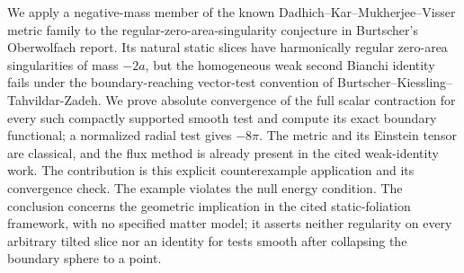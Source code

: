 
We apply a negative-mass member of the known Dadhich--Kar--Mukherjee--Visser
metric family to the regular-zero-area-singularity conjecture in Burtscher's
Oberwolfach report. Its natural static slices have harmonically regular
zero-area singularities of mass $-2a$, but the homogeneous weak second Bianchi
identity fails under the boundary-reaching vector-test convention of
Burtscher--Kiessling--Tahvildar-Zadeh. We prove absolute convergence of the full
scalar contraction for every such compactly supported smooth test and compute
its exact boundary functional; a normalized radial test gives $-8\pi$.
The metric and its Einstein tensor are classical, and the flux method is
already present in the cited weak-identity work. The contribution is this
explicit counterexample application and its convergence check. The example
violates the null energy condition. The conclusion concerns the geometric
implication in the cited static-foliation framework, with no specified matter
model; it asserts neither regularity on every arbitrary tilted slice nor an
identity for tests smooth after collapsing the boundary sphere to a point.
